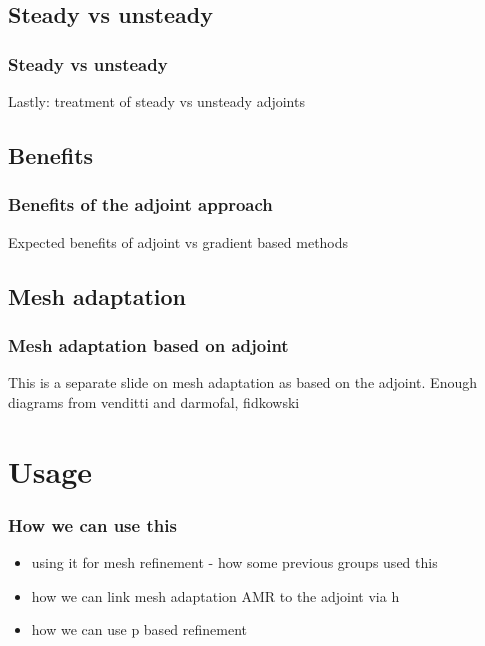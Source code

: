 \documentclass{beamer}
\begin{document}

\subsection{Steady vs unsteady}
\begin{frame}
\scriptsize
\frametitle{Steady vs unsteady}
Lastly: treatment of steady vs unsteady adjoints
\end{frame}


\subsection{Benefits}
\begin{frame}
\scriptsize
\frametitle{Benefits of the adjoint approach}
Expected benefits of adjoint vs gradient based methods
\end{frame}


\subsection{Mesh adaptation}
\begin{frame}
\scriptsize
\frametitle{Mesh adaptation based on adjoint}
This is a separate slide on mesh adaptation as based on the adjoint. Enough diagrams from venditti and darmofal, fidkowski
\end{frame}



\section[Usage]{Usage}

\begin{frame}%
\frametitle{How we can use this}
\scriptsize
\begin{itemize}
\item using it for mesh refinement - how some previous groups used this
\item how we can link mesh adaptation AMR to the adjoint via h
\item how we can use p based refinement
\end{itemize}
\end{frame}
\end{document}
